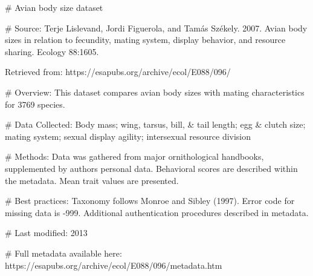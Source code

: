 # Avian body size dataset

# Source: 
Terje Lislevand, Jordi Figuerola, and Tamás Székely. 2007. Avian body sizes in relation to fecundity, mating system, display behavior, and resource sharing. Ecology 88:1605.

Retrieved from: https://esapubs.org/archive/ecol/E088/096/

# Overview: 
This dataset compares avian body sizes with mating characteristics for 3769 species.

# Data Collected: 
Body mass; wing, tarsus, bill, & tail length; egg & clutch size; mating system; sexual display agility; intersexual resource division 

# Methods: 
Data was gathered from major ornithological handbooks, supplemented by authors personal data. Behavioral scores are described within the metadata. Mean trait values are presented.

# Best practices: 
Taxonomy follows Monroe and Sibley (1997). Error code for missing data is -999. Additional authentication procedures described in metadata.

# Last modified: 
2013

# Full metadata available here:
https://esapubs.org/archive/ecol/E088/096/metadata.htm